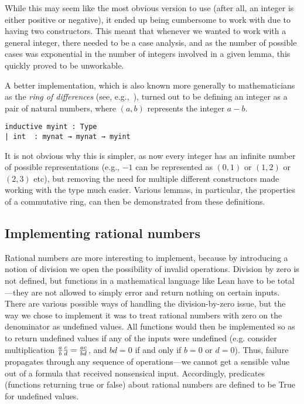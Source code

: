 \documentclass{article} %
\theoremstyle{plain}
\theoremstyle{definition}
\newcommand{\Lean}{\textsf{Lean}\xspace}
\begin{document}
While this may seem like the most obvious version to use (after all, an integer is either positive or negative),
it ended up being cumbersome to work with due to having two constructors.
This meant that whenever we wanted to work with a general integer, there needed to be a case analysis,
and as the number of possible cases was exponential in the number of integers involved in a given lemma, this quickly proved to be unworkable.

A better implementation,
which is also known more generally to mathematicians as the \emph{ring of differences}
(see, e.g.,~\cite[Proposition~4.2]{ELBASHIR2001277}),
turned out to be defining an integer as a pair of natural numbers,
where $(a, b)$ represents the integer $a - b$.
\begin{lstlisting}
inductive myint : Type
| int  : mynat → mynat → myint
\end{lstlisting}
It is not obvious why this is simpler, as now every integer has an infinite number of possible representations
(e.g., $-1$ can be represented as $(0, 1)$ or $(1, 2)$ or $(2, 3)$ etc),
but removing the need for multiple different constructors made working with the type much easier.
Various lemmas, in particular, the properties of a commutative ring, can then be demonstrated from these definitions.

\subsection{Implementing rational numbers}
Rational numbers are more interesting to implement, because by introducing a notion of division we open the possibility of invalid operations.  
Division by zero is not defined, but functions in a mathematical language like \Lean have to be total---they are not allowed to simply error and return nothing on certain inputs.  
There are various possible ways of handling the division-by-zero issue,
but the way we chose to implement it was to treat rational numbers with zero on the denominator as undefined values.
All functions would then be implemented so as to return undefined values if any of the inputs were undefined
(e.g. consider multiplication $\frac{a}{b} \* \frac{c}{d} = \frac{ac}{bd} $, and $bd = 0$ if and only if $b = 0$ or $d = 0$).
Thus, failure propagates through any sequence of operations---we cannot get a sensible value out of a formula that received nonsensical input.  
Accordingly, predicates (functions returning true or false) about rational numbers are defined to be True for undefined values.  
\end{document}
